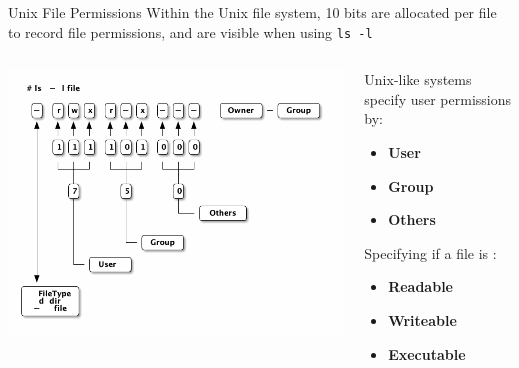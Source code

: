 \documentclass[11pt]{beamer}
\begin{document}
\begin{frame}{Unix File Permissions}
Within the Unix file system, 10 bits are allocated per file to record file permissions, and are visible when using \texttt{ls -l}
\vspace{-1em}
\begin{columns}
\begin{column}{0.6\textwidth}
\center
\includegraphics[scale=0.3]{permissions.png}
\end{column}
\begin{column}{0.4\textwidth}
Unix-like systems specify user permissions by:
\begin{itemize}
\item \textbf{User}
\item \textbf{Group}
\item \textbf{Others}
\end{itemize}
Specifying if a file is :
\begin{itemize}
\item \textbf{Readable}
\item \textbf{Writeable}
\item \textbf{Executable}
\end{itemize}
\end{column}
\end{columns}
\end{frame}
\end{document}

